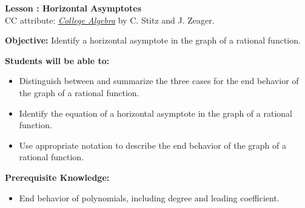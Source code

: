 \documentclass[12pt]{article}
\theoremstyle{definition}
\begin{document}
{\bf \large Lesson : Horizontal Asymptotes}
\\ CC attribute: \href{http://www.stitz-zeager.com}{\it{College Algebra}} by C. Stitz and J. Zeager. 
\hfill \doclicenseImage[imagewidth=5em]\\
\par
{\bf Objective:} Identify a horizontal asymptote in the graph of a rational function.\\
\par
{\bf Students will be able to:}
\begin{itemize}
	\item Distinguish between and summarize the three cases for the end behavior of the graph of a rational function. 
	\item Identify the equation of a horizontal asymptote in the graph of a rational function.
	\item Use appropriate notation to describe the end behavior of the graph of a rational function.
\end{itemize}
{\bf Prerequisite Knowledge:}
\begin{itemize}
	\item End behavior of polynomials, including degree and leading coefficient.
\end{itemize}
\hrulefill
\end{document}
